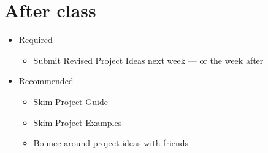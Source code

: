 \documentclass[11pt]{article}
\begin{document}
\section*{After class}

\begin{itemize}
\item Required
\begin{itemize}
\item Submit Revised Project Ideas next week --- or the week after 
\end{itemize}
\item Recommended
\begin{itemize}
\item Skim Project Guide 
\item Skim Project Examples 
\item Bounce around project ideas with friends 
\end{itemize}
\end{itemize}



\end{document}
